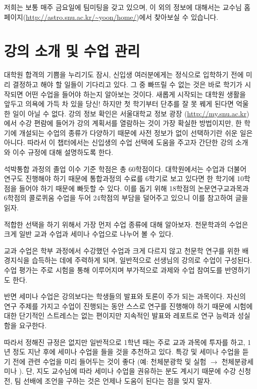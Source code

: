 저희는 보통 매주 금요일에 팀미팅을 갖고 있으며, 이 외의 정보에 대해서는 교수님 홈페이지(\url{http://astro.snu.ac.kr/~yoon/home/})에서 찾아보실 수 있습니다.

\vspace{0.05\textheight}

\section{강의 소개 및 수업 관리}
대학원 합격의 기쁨을 누리기도 잠시, 신입생 여러분에게는 정식으로 입학하기 전에 미리 결정하고 해야 할 일들이 기다리고 있다. 그 중 빠뜨릴 수 없는 것은 바로 학기가 시작되면 어떤 수업을 들어야 하는지 알아보는 것이다. 새롭게 시작되는 대학원 생활을 앞두고 의욕에 가득 차 있을 당신! 하지만 첫 학기부터 단추를 잘 못 꿰게 된다면 억울한 일이 아닐 수 없다. 강의 정보 확인은 서울대학교 정보 광장 (\url{http://my.snu.ac.kr})에서 수강 편람에 들어가 강의 계획서를 열람하는 것이 가장 확실한 방법이지만, 한 학기에 개설되는 수업의 종류가 다양하기 때문에 사전 정보가 없이 선택하기란 쉬운 일은 아니다. 따라서 이 챕터에서는 신입생의 수업 선택에 도움을 주고자 간단한 강의 소개와 이수 규정에 대해 설명하도록 한다.

석박통합 과정의 졸업 이수 기준 학점은 총 60학점이다. 대학원에서는 수업과 더불어 연구도 진행해야 하기 때문에 통합과정의 수료를 6학기로 보고 있다면 한 학기에 10학점을 들어야 하기 때문에 빠듯할 수 있다. 이를 돕기 위해 18학점의 논문연구교과목과 6학점의 콜로퀴움 수업을 두어 24학점의 부담을 덜어주고 있으니 이를 참고하여 글을 읽자.

적합한 선택을 하기 위해서 가장 먼저 수업 종류에 대해 알아보자. 천문학과의 수업은 크게 일반 교과 수업과 세미나 수업으로 나누어 볼 수 있다.
\begin{packed_item}
\item 교과 수업은 학부 과정에서 수강했던 수업과 크게 다르지 않고 천문학 연구를 위한 배경지식을 습득하는 데에 주력하게 되며, 일반적으로 선생님의 강의로 수업이 구성된다. 수업 평가는 주로 시험을 통해 이루어지며 부가적으로 과제와 수업 참여도를 반영하기도 한다.
\item 반면 세미나 수업은 강의보다는 학생들의 발표와 토론이 주가 되는 과목이다. 자신의 연구 주제를 가지고 수업이 진행되는 동안 스스로 연구를 진행해야 하기 때문에 시험에 대한 단기적인 스트레스는 없는 편이지만 지속적인 발표와 레포트로 연구 능력과 성실함을 요구한다.
\end{packed_item}
 따라서 정해진 규정은 없지만 일반적으로 1학년 때는 주로 교과 과목에 투자를 하고, 1년 정도 지난 후에 세미나 수업을 들을 것을 추천하고 있다. 특강 및 세미나 수업을 듣기 전에 관련 수업을 미리 들어두는 것이 좋다 (예: 천체분광학 및 실험 $\rightarrow$ 천체분광세미나 ). 단, 지도 교수님에 따라 세미나 수업을 권유하는 분도 계시기 때문에 수강 신청 전, 팀 선배에 조언을 구하는 것은 언제나 도움이 된다는 점을 잊지 말자.

